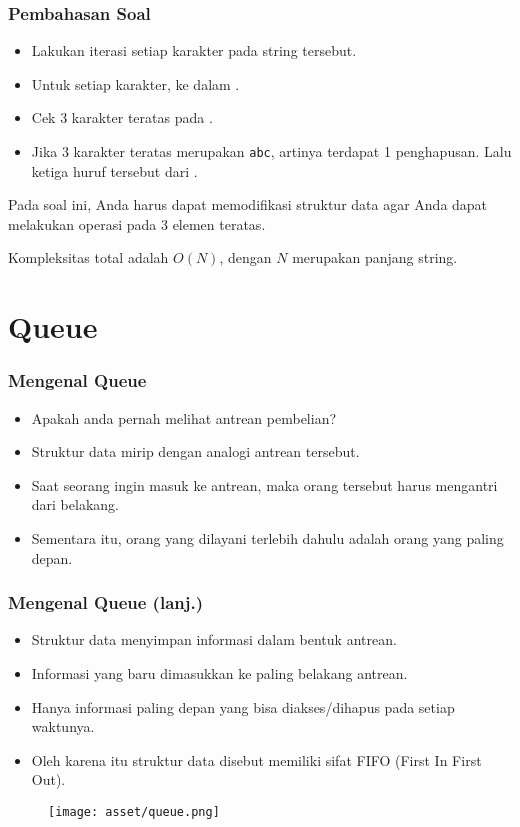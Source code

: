 \begin{frame}
\frametitle{Pembahasan Soal}

\begin{itemize}
  \item Lakukan iterasi setiap karakter pada string tersebut.
  \item Untuk setiap karakter,  ke dalam .
  \item Cek 3 karakter teratas pada .
  \item Jika 3 karakter teratas merupakan \texttt{abc}, artinya terdapat 1 penghapusan. Lalu  ketiga huruf tersebut dari .
\end{itemize}
Pada soal ini, Anda harus dapat memodifikasi struktur data  agar Anda dapat melakukan operasi  pada 3 elemen teratas.

Kompleksitas total adalah $O(N)$, dengan $N$ merupakan panjang string.
\end{frame}

\section{Queue}
\frame{\sectionpage}

\begin{frame}
\frametitle{Mengenal Queue}
\begin{itemize}
  \item Apakah anda pernah melihat antrean pembelian?
  \item Struktur data  mirip dengan analogi antrean tersebut.
  \item Saat seorang ingin masuk ke antrean, maka orang tersebut harus mengantri dari belakang. \item Sementara itu, orang yang dilayani terlebih dahulu adalah orang yang paling depan.
\end{itemize}
\end{frame}

\begin{frame}
\frametitle{Mengenal Queue (lanj.)}
\begin{itemize}
  \item Struktur data  menyimpan informasi dalam bentuk antrean.
  \item Informasi yang baru dimasukkan ke paling belakang antrean.
  \item Hanya informasi paling depan yang bisa diakses/dihapus pada setiap waktunya.
  \item Oleh karena itu struktur data  disebut memiliki sifat FIFO (First In First Out).
\end{itemize}

\begin{figure}
  \centering
  \texttt{[image: asset/queue.png]}
\end{figure}
\end{frame}

